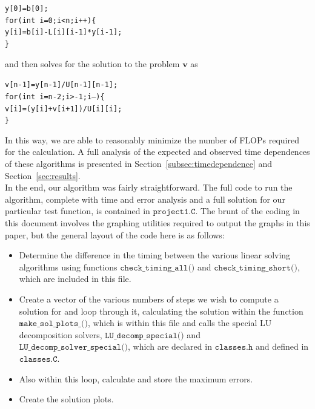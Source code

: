 \documentclass[12pt]{article}
\numberwithin{equation}{section}
\begin{document}
\begin{1stlisting}
\texttt{y[0]=b[0]; \\\indent for(int i=0;i<n;i++)\{ \\\indent\indent y[i]=b[i]-L[i][i-1]*y[i-1]; \\\indent\}}
\end{1stlisting}

\noindent and then solves for the solution to the problem $\textbf{v}$ as

\begin{1stlisting}
\texttt{v[n-1]=y[n-1]/U[n-1][n-1]; \\\indent for(int i=n-2;i>-1;i--)\{ \\\indent\indent v[i]=(y[i]+v[i+1])/U[i][i];\\\indent\}}
\end{1stlisting}

\noindent In this way, we are able to reasonably minimize the number of FLOPs required for the calculation.  A full analysis of the expected and observed time dependences of these algorithms is presented in Section~\ref{subsec:timedependence} and Section~\ref{sec:results}.
\\\indent In the end, our algorithm was fairly straightforward.  The full code to run the algorithm, complete with time and error analysis and a full solution for our particular test function, is contained in $\texttt{project1.C}$.  The brunt of the coding in this document involves the graphing utilities required to output the graphs in this paper, but the general layout of the code here is as follows:

\begin{itemize}
\item Determine the difference in the timing between the various linear solving algorithms using functions $\texttt{check\_timing\_all()}$ and $\texttt{check\_timing\_short()}$, which are included in this file.
\item Create a vector of the various numbers of steps we wish to compute a solution for and loop through it, calculating the solution within the function $\texttt{make\_sol\_plots\_()}$, which is within this file and calls the special LU decomposition solvers, $\texttt{LU\_decomp\_special()}$ and $\texttt{LU\_decomp\_solver\_special()}$, which are declared in $\texttt{classes.h}$ and defined in $\texttt{classes.C}$.  
\item Also within this loop, calculate and store the maximum errors.
\item Create the solution plots.
\end{itemize}
\end{document}
